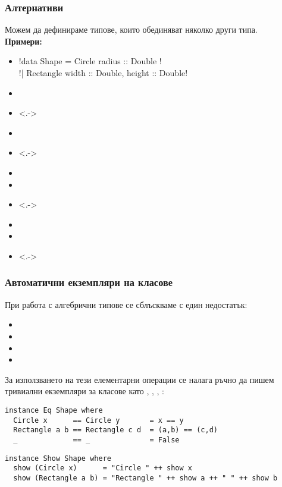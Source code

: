 \documentclass[alsotrans]{beamerswitch}
\begin{document}
\begin{frame}[fragile]
  \frametitle{Алтернативи}
  Можем да дефинираме типове, които обединяват няколко други типа.\\
  \pause
  \textbf{Примери:}
  \begin{itemize}[<+->]
  \item \lst!data Shape = Circle { radius :: Double } !\\
    \hspace{4em}\lst!| Rectangle { width :: Double, height :: Double}!
  \item {}
  \item<.-> 
  \item {}
  \item<.-> 
  \item {}
  \item {}
  \item<.-> 
  \item {}
  \item {}
  \item<.-> 
  \end{itemize}
\end{frame}

\begin{frame}[fragile]
  \frametitle{Автоматични екземпляри на класове}

  При работа с алгебрични типове се сблъскваме с един недостатък:\pause
  \begin{itemize}[<+->]
  \item {}
  \item {}
  \item {}
  \item {}
  \end{itemize}
  \onslide<+->
  За използването на тези елементарни операции се налага ръчно да пишем тривиални екземпляри за класове като , , , :
  \onslide<+->
  \small
\begin{lstlisting}
instance Eq Shape where
  Circle x      == Circle y       = x == y
  Rectangle a b == Rectangle c d  = (a,b) == (c,d)
  _             == _              = False
\end{lstlisting}
  \onslide<+->
\begin{lstlisting}
instance Show Shape where
  show (Circle x)      = "Circle " ++ show x
  show (Rectangle a b) = "Rectangle " ++ show a ++ " " ++ show b
\end{lstlisting}
\end{frame}
\end{document}

